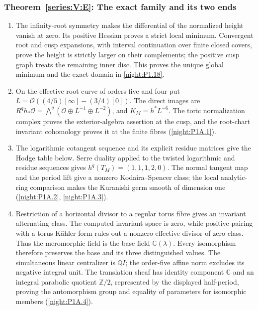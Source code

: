 \hypertarget{outline-V-E}{}
\subsubsection*{Theorem~\ref{series:V:E}: The exact family and its two ends}
\begin{enumerate}[label=\arabic*.,leftmargin=*]
\item\hypertarget{step-V-E-1}{} The infinity-root symmetry makes the differential of the normalized height vanish at zero. Its positive Hessian proves a strict local minimum. Convergent root and cusp expansions, with interval continuation over finite closed covers, prove the height is strictly larger on their complements; the positive cusp graph treats the remaining inner disc. This proves the unique global minimum and the exact domain in \cref{night:P1.18}.

\item\hypertarget{step-V-E-2}{} On the effective root curve of orders five and four put
  $L=\mathcal O((4/5)[\infty]-(3/4)[0])$.  The direct images are
  $R^qh_*\mathcal O=\bigwedge^q
  (\mathcal O\oplus L^{-1}\oplus L^{-2})$, and
  $K_M=h^*L^{-6}$.  The toric normalization complex proves the
  exterior-algebra assertion at the cusp, and the root-chart
  invariant cohomology proves it at the finite fibres
  (\cref{night:P1A.1}).

\item\hypertarget{step-V-E-3}{} The logarithmic cotangent sequence and its explicit residue
  matrices give the Hodge table below.  Serre duality applied to
  the twisted logarithmic and residue sequences gives
  $h^q(T_M)=(1,1,1,2,0)$.  The normal tangent map and the period lift give a nonzero Kodaira--Spencer class; the local
  analytic-ring comparison makes the Kuranishi germ smooth of
  dimension one (\cref{night:P1A.2}, \cref{night:P1A.3}).

\item\hypertarget{step-V-E-4}{} Restriction of a horizontal divisor to a regular torus fibre
  gives an invariant alternating class.  The computed invariant
  space is zero, while positive pairing with a torus Kähler form
  rules out a nonzero effective divisor of zero class.  Thus the
  meromorphic field is the base field $\mathbb C(\lambda)$.
  Every isomorphism therefore preserves the base and its three
  distinguished values.  The simultaneous linear centralizer is
  $\mathbb Q I$; the order-five affine norm excludes its negative
  integral unit.  The translation sheaf has identity component
  $\mathbb C$ and an integral parabolic quotient $\mathbb Z/2$,
  represented by the displayed half-period, proving the
  automorphism group and equality of parameters for isomorphic
  members (\cref{night:P1A.4}).


\end{enumerate}
